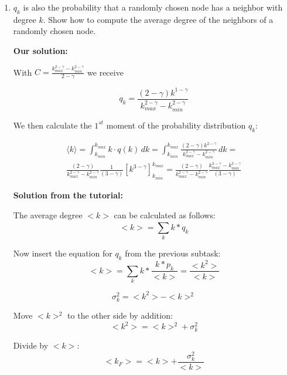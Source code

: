 \begin{enumerate}
	\item $q_k$ is also the probability that a randomly chosen node has a neighbor with degree $k$. Show how to compute the average degree of the neighbors of a randomly chosen node.
	
	\textbf{Our solution:}
	
	With $C = \frac{k_{max}^{2-\gamma} - k_{min}^{2-\gamma}}{2-\gamma}$ we receive
	
	\begin{equation}
		q_k = \frac{(2-\gamma)k^{1-\gamma}}{k_{max}^{2-\gamma} - k_{min}^{2-\gamma}}
	\end{equation}

	We then calculate the $1^{st}$ moment of the probability distribution $q_k$:
	
	\begin{equation} \label{k_neighbors}
		\begin{split}
			\langle k \rangle = \int_{k_{min}}^{k_{max}} k \cdot q(k) \, dk = \int_{k_{min}}^{k_{max}} \frac{(2-\gamma)k^{2-\gamma}}{k_{max}^{2-\gamma} - k_{min}^{2-\gamma}} \, dk = \\
			\frac{(2-\gamma)}{k_{max}^{2-\gamma} - k_{min}^{2-\gamma}} \frac{1}{(3-\gamma)} [k^{3-\gamma}]_{k_{min}}^{k_{max}} = \frac{(2-\gamma)}{k_{max}^{2-\gamma} - k_{min}^{2-\gamma}} \frac{k_{max}^{3-\gamma} - k_{min}^{3-\gamma}}{(3-\gamma)} 
		\end{split}
	\end{equation}
	
	\textbf{Solution from the tutorial:}
	
	The average degree $<k>$ can be calculated as follows:
	\begin{equation}
		<k> = \sum_{k}^{} k * q_k
	\end{equation}
	
	Now insert the equation for $q_k$ from the previous subtask:
	\begin{equation}
		<k> = \sum_{k}^{} k * \frac{k * p_k}{<k>} = \frac{<k^2>}{<k>}
	\end{equation}
	
	\begin{equation}
		\sigma_k^2 = <k^2> - <k>^2
	\end{equation}
	
	Move $<k>^2$ to the other side by addition:
	\begin{equation*}
		<k^2> = <k>^2 + \sigma_k^2
	\end{equation*}
	
	Divide by $<k>$:
	\begin{equation*}
		<k_F> = <k> + \frac{\sigma_k^2}{<k>}
	\end{equation*}
	

\end{enumerate}

